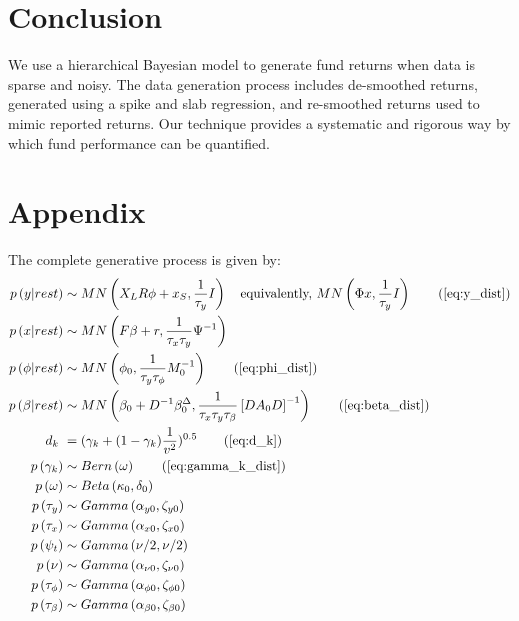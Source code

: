 \documentclass[11pt]{article}
\begin{document}
\section{Conclusion}
We use a hierarchical Bayesian model to generate fund returns when data is sparse and noisy. The data generation process includes de-smoothed returns, generated using a spike and slab regression, and re-smoothed returns used to mimic reported returns. Our technique provides a systematic and rigorous way by which fund performance can be quantified.

\newpage

\singlespacing
\setlength\bibsep{3pt}




\newpage

\section{Appendix}
The complete generative process is given by:
\begin{align}
	p\left(y|rest\right)	&\sim	MN\left(X_{L}R\phi+x_{S},\frac{1}{\tau_{y}}I\right) \quad \text{equivalently,~}MN\left(\Phi x,\frac{1}{\tau_{y}}I\right) \tag{\ref{eq:y_dist}}\\
	p\left(x|rest\right)	&\sim	MN\left(F\beta+r,\frac{1}{\tau_{x}\tau_{y}}\Psi^{-1}\right)\\
	p\left(\phi|rest\right)	&\sim	MN\left(\phi_{0},\frac{1}{\tau_{y}\tau_{\phi}}M_{0}^{-1}\right) \tag{\ref{eq:phi_dist}}\\
	p\left(\beta|rest\right)	&\sim	MN\left(\beta_{0}+D^{-1}\beta_{0}^{\Delta},\frac{1}{\tau_{x}\tau_{y}\tau_{\beta}}\left[DA_{0}D\right]^{-1}\right) \tag{\ref{eq:beta_dist}}\\
	d_{k}\			&=		(\gamma_{k}+(1-\gamma_{k})\frac{1}{v^{2}})^{0.5} \tag{\ref{eq:d_k}}\\
	p\left(\gamma_{k}\right)&\sim	Bern\left(\omega\right) \tag{\ref{eq:gamma_k_dist}}\\
	p\left(\omega\right)	&\sim 	Beta\left(\kappa_{0},\delta_{0}\right)\\
	p\left(\tau_{y}\right)	&\sim	Gamma\left(\alpha_{y0},\zeta_{y0}\right)\\
	p\left(\tau_{x}\right)	&\sim	Gamma\left(\alpha_{x0},\zeta_{x0}\right)\\
	p\left(\psi_{t}\right)	&\sim	Gamma\left(\nu/2,\nu/2\right)\\
	p\left(\nu\right)		&\sim	Gamma\left(\alpha_{\nu0},\zeta_{\nu0}\right)\\
	p\left(\tau_{\phi}\right)&\sim	Gamma\left(\alpha_{\phi0},\zeta_{\phi0}\right)\\
	p\left(\tau_{\beta}\right)&\sim	Gamma\left(\alpha_{\beta0},\zeta_{\beta0}\right)
\end{align}
\end{document}
